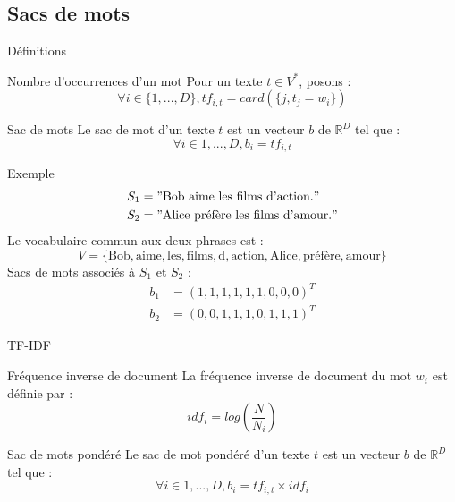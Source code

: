 \documentclass{beamer}
\begin{document}
\subsection{Sacs de mots}

\begin{frame}{Définitions}
\begin{block}{Nombre d’occurrences d'un mot}
Pour un texte $t \in V^{*}$, posons :
$$
\forall i \in \{1, ..., D\}, tf_{i,t} = card(\{j, t_{j}=w_{i}\})
$$
\end{block}

\begin{block}{Sac de mots}
Le sac de mot d'un texte $t$ est un vecteur $b$ de $\mathbb{R}^{D}$ tel que :
$$
\forall i \in {1, ..., D}, b_{i} = tf_{i,t}
$$
\end{block}
\end{frame}

\begin{frame}{Exemple}
\begin{align*}
S_{1} & = "\text{Bob aime les films d'action.}" \\
S_{2} & = "\text{Alice préfère les films d'amour.}"
\end{align*}
Le vocabulaire commun aux deux phrases est :
$$
V = \{\text{Bob}, \text{aime}, \text{les}, \text{films}, \text{d}, \text{action}, \text{Alice}, \text{préfère}, \text{amour}\}
$$
Sacs de mots associés à $S_{1}$ et $S_{2}$ :
\begin{align*}
b_{1} & = (1, 1, 1, 1, 1, 1, 0, 0, 0)^{T} \\
b_{2} & = (0, 0, 1, 1, 1, 0, 1, 1, 1)^{T}
\end{align*}
\end{frame}

\begin{frame}{TF-IDF}
\begin{block}{Fréquence inverse de document}
La fréquence inverse de document du mot $w_{i}$ est définie par :
$$
idf_{i} = log(\frac{N}{N_{i}})
$$
\end{block}

\begin{block}{Sac de mots pondéré}
Le sac de mot pondéré d'un texte $t$ est un vecteur $b$ de $\mathbb{R}^{D}$ tel que :
$$
\forall i \in {1, ..., D}, b_{i} = tf_{i,t} \times idf_{i}
$$
\end{block}
\end{frame}
\end{document}
